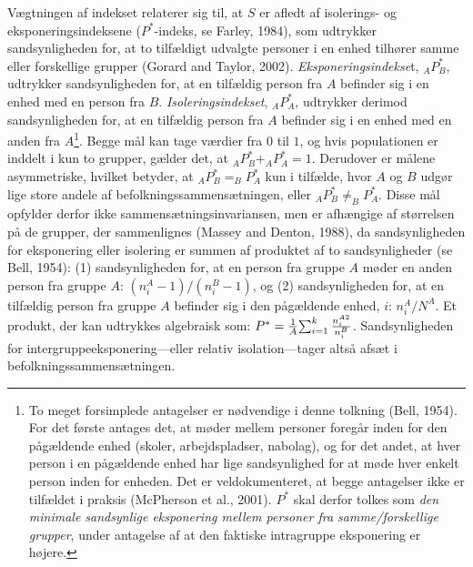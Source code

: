 \documentclass[
]{book}
\begin{document}
Vægtningen af indekset relaterer sig til, at \(S\) er afledt af isolerings- og eksponeringsindeksene (\(P^{*}\)-indeks, se Farley, 1984), som udtrykker sandsynligheden for, at to tilfældigt udvalgte personer i en enhed tilhører samme eller forskellige grupper (Gorard and Taylor, 2002). \emph{Eksponeringsindekse}t, \(_{A}P^{*}_{B}\), udtrykker sandsynligheden for, at en tilfældig person fra \(A\) befinder sig i en enhed med en person fra \(B\). \emph{Isoleringsindekset}, \(_{A}P^{*}_{A}\), udtrykker derimod sandsynligheden for, at en tilfældig person fra \(A\) befinder sig i en enhed med en anden fra \(A\)\footnote{To meget forsimplede antagelser er nødvendige i denne tolkning (Bell, 1954). For det første antages det, at møder mellem personer foregår inden for den pågældende enhed (skoler, arbejdspladser, nabolag), og for det andet, at hver person i en pågældende enhed har lige sandsynlighed for at møde hver enkelt person inden for enheden. Det er veldokumenteret, at begge antagelser ikke er tilfældet i praksis (McPherson et al., 2001). \(P^{*}\) skal derfor tolkes som \emph{den minimale sandsynlige eksponering mellem personer fra samme/forskellige grupper}, under antagelse af at den faktiske intragruppe eksponering er højere.}. Begge mål kan tage værdier fra \(0\) til \(1\), og hvis populationen er inddelt i kun to grupper, gælder det, at \(_{A}P^{*}_{B} + _{A}P^{*}_{A} = 1\). Derudover er målene asymmetriske, hvilket betyder, at \(_{A}P^{*}_{B} = _{B}P^{*}_{A}\) kun i tilfælde, hvor \(A\) og \(B\) udgør lige store andele af befolkningssammensætningen, eller \(_{A}P^{*}_{B} \neq _{B}P^{*}_{A}\). Disse mål opfylder derfor ikke sammensætningsinvariansen, men er afhængige af størrelsen på de grupper, der sammenlignes (Massey and Denton, 1988), da sandsynligheden for eksponering eller isolering er summen af produktet af to sandsynligheder (se Bell, 1954): (1) sandsynligheden for, at en person fra gruppe \(A\) møder en anden person fra gruppe \(A\): \(\left( n_{i}^{A} - 1 \right) / \left( n_{i}^{B} - 1 \right)\), og (2) sandsynligheden for, at en tilfældig person fra gruppe \(A\) befinder sig i den pågældende enhed, \(i\): \(n_{i}^{A} / N^{A}\). Et produkt, der kan udtrykkes algebraisk som: \(P^{*}=\frac{1}{A} {\textstyle \sum_{i=1}^{k}\frac{n_{i}^{A \space 2}}{n_{i}^{B}}}\). Sandsynligheden for intergruppeeksponering---eller relativ isolation---tager altså afsæt i befolkningssammensætningen.
\end{document}
